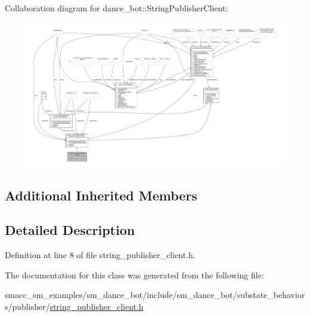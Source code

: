 Collaboration diagram for dance\+\_\+bot\+:\+:String\+Publisher\+Client\+:
\nopagebreak
\begin{figure}[H]
\begin{center}
\leavevmode
\includegraphics[width=350pt]{classdance__bot_1_1StringPublisherClient__coll__graph}
\end{center}
\end{figure}
\subsection*{Additional Inherited Members}


\subsection{Detailed Description}


Definition at line 8 of file string\+\_\+publisher\+\_\+client.\+h.



The documentation for this class was generated from the following file\+:\begin{DoxyCompactItemize}
\item 
smacc\+\_\+sm\+\_\+examples/sm\+\_\+dance\+\_\+bot/include/sm\+\_\+dance\+\_\+bot/substate\+\_\+behaviors/publisher/\hyperlink{string__publisher__client_8h}{string\+\_\+publisher\+\_\+client.\+h}\end{DoxyCompactItemize}
